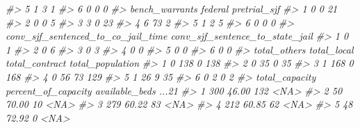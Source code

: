 \documentclass[
]{krantz}
\makeatletter
\newenvironment{Shaded}{\begin{snugshade}}{\end{snugshade}}
\newcommand{\CommentTok}[1]{\textcolor[rgb]{0.37,0.37,0.37}{\textit{#1}}}
\newenvironment{kframe}{%
\medskip{}
\setlength{\fboxsep}{.8em}
 \def\at@end@of@kframe{}%
 \ifinner\ifhmode%
  \def\at@end@of@kframe{\end{minipage}}%
  \begin{minipage}{\columnwidth}%
 \fi\fi%
 \def\FrameCommand##1{\hskip\@totalleftmargin \hskip-\fboxsep
 \colorbox{shadecolor}{##1}\hskip-\fboxsep
     \hskip-\linewidth \hskip-\@totalleftmargin \hskip\columnwidth}%
 \MakeFramed {\advance\hsize-\width
   \@totalleftmargin\z@ \linewidth\hsize
   \@setminipage}}%
 {\par\unskip\endMakeFramed%
 \at@end@of@kframe}
\renewenvironment{Shaded}{\begin{kframe}}{\end{kframe}}
\makeatother
\begin{document}
\begin{Shaded}
\begin{Highlighting}[]
\CommentTok{\#\textgreater{} 5                                  1             3         1}
\CommentTok{\#\textgreater{} 6                                  0             0         0}
\CommentTok{\#\textgreater{}   bench\_warrants federal pretrial\_sjf}
\CommentTok{\#\textgreater{} 1              0       0           21}
\CommentTok{\#\textgreater{} 2              0       0            5}
\CommentTok{\#\textgreater{} 3              3       0           23}
\CommentTok{\#\textgreater{} 4              6      73            2}
\CommentTok{\#\textgreater{} 5              1       2            5}
\CommentTok{\#\textgreater{} 6              0       0            0}
\CommentTok{\#\textgreater{}   conv\_sjf\_sentenced\_to\_co\_jail\_time conv\_sjf\_sentence\_to\_state\_jail}
\CommentTok{\#\textgreater{} 1                                  0                               1}
\CommentTok{\#\textgreater{} 2                                  0                               6}
\CommentTok{\#\textgreater{} 3                                  0                               3}
\CommentTok{\#\textgreater{} 4                                  0                               0}
\CommentTok{\#\textgreater{} 5                                  0                               0}
\CommentTok{\#\textgreater{} 6                                  0                               0}
\CommentTok{\#\textgreater{}   total\_others total\_local total\_contract total\_population}
\CommentTok{\#\textgreater{} 1            0         138              0              138}
\CommentTok{\#\textgreater{} 2            0          35              0               35}
\CommentTok{\#\textgreater{} 3            1         168              0              168}
\CommentTok{\#\textgreater{} 4            0          56             73              129}
\CommentTok{\#\textgreater{} 5            1          26              9               35}
\CommentTok{\#\textgreater{} 6            0           2              0                2}
\CommentTok{\#\textgreater{}   total\_capacity percent\_of\_capacity available\_beds ...21}
\CommentTok{\#\textgreater{} 1            300               46.00            132  \textless{}NA\textgreater{}}
\CommentTok{\#\textgreater{} 2             50               70.00             10  \textless{}NA\textgreater{}}
\CommentTok{\#\textgreater{} 3            279               60.22             83  \textless{}NA\textgreater{}}
\CommentTok{\#\textgreater{} 4            212               60.85             62  \textless{}NA\textgreater{}}
\CommentTok{\#\textgreater{} 5             48               72.92              0  \textless{}NA\textgreater{}}

\end{Highlighting}
\end{Shaded}
\end{document}

